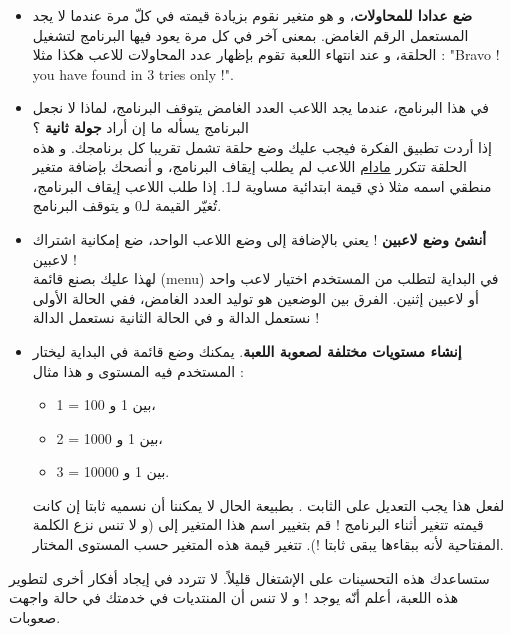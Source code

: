 \begin{itemize}
	\item \textbf{ضع عدادا للمحاولات}،
	و هو متغير نقوم بزيادة قيمته في كلّ مرة عندما لا يجد المستعمل الرقم الغامض. بمعنى آخر في كل مرة يعود فيها البرنامج لتشغيل الحلقة، و عند انتهاء اللعبة تقوم بإظهار عدد المحاولات للاعب هكذا مثلا :
	"\textenglish{Bravo ! you have found in 3 tries only !}".
	\item في هذا البرنامج، عندما يجد اللاعب العدد الغامض يتوقف البرنامج، لماذا لا نجعل البرنامج يسأله ما إن أراد 
	\textbf{جولة ثانية} ؟\\
	إذا أردت تطبيق الفكرة فيجب عليك وضع حلقة تشمل تقريبا كل برنامجك. و هذه الحلقة تتكرر 
	\underline{مادام}
	اللاعب لم يطلب إيقاف البرنامج، و أنصحك بإضافة متغير منطقي اسمه مثلا
ذي قيمة ابتدائية مساوية لـ1. إذا طلب اللاعب إيقاف البرنامج، تُغيّر القيمة لـ0 و يتوقف البرنامج.
	\item \textbf{أنشئ وضع لاعبين} !
	 يعني بالإضافة إلى وضع اللاعب الواحد، ضع إمكانية اشتراك لاعبين !\\
	 لهذا عليك بصنع قائمة
	 (\textenglish{menu})
	 في البداية لتطلب من المستخدم اختيار لاعب واحد أو لاعبين إثنين. الفرق بين الوضعين هو توليد العدد الغامض، ففي الحالة الأولى نستعمل الدالة 
	 و في الحالة الثانية نستعمل الدالة
	  !
	 \item \textbf{إنشاء مستويات مختلفة لصعوبة اللعبة}.
	  يمكنك وضع قائمة في البداية ليختار المستخدم فيه المستوى و هذا مثال :
	 \begin{itemize}
	 	\item 1 = بين 1 و 100،
	 	\item 2 = بين 1 و 1000،
	 	\item 3 = بين 1 و 10000.
	 \end{itemize}
 لفعل هذا يجب التعديل على الثابت
 .
 بطبيعة الحال لا يمكننا أن نسميه ثابتا إن كانت قيمته تتغير أثناء البرنامج ! قم بتغيير اسم هذا المتغير إلى 
 (و لا تنس نزع الكلمة المفتاحية 
 لأنه ببقاءها يبقى ثابتا !). تتغير قيمة هذه المتغير حسب المستوى المختار.
\end{itemize}

ستساعدك هذه التحسينات على الإشتغال قليلاً. لا تتردد في إيجاد أفكار أخرى لتطوير هذه اللعبة، أعلم أنّه يوجد ! و لا تنس أن المنتديات في خدمتك في حالة واجهت صعوبات.
